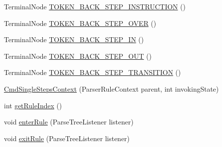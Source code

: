 \begin{DoxyCompactItemize}
\item 
Terminal\+Node \hyperlink{classgov_1_1nasa_1_1jpf_1_1inspector_1_1client_1_1parser_1_1_console_grammar_parser_1_1_cmd_single_steps_context_acb7be39b49bcbaf600f6c22a334f6948}{T\+O\+K\+E\+N\+\_\+\+B\+A\+C\+K\+\_\+\+S\+T\+E\+P\+\_\+\+I\+N\+S\+T\+R\+U\+C\+T\+I\+ON} ()
\item 
Terminal\+Node \hyperlink{classgov_1_1nasa_1_1jpf_1_1inspector_1_1client_1_1parser_1_1_console_grammar_parser_1_1_cmd_single_steps_context_aea2cfa751f70d23f30ddd33f78c74a2c}{T\+O\+K\+E\+N\+\_\+\+B\+A\+C\+K\+\_\+\+S\+T\+E\+P\+\_\+\+O\+V\+ER} ()
\item 
Terminal\+Node \hyperlink{classgov_1_1nasa_1_1jpf_1_1inspector_1_1client_1_1parser_1_1_console_grammar_parser_1_1_cmd_single_steps_context_a0e514f8306470231d1fcf880bfb5f018}{T\+O\+K\+E\+N\+\_\+\+B\+A\+C\+K\+\_\+\+S\+T\+E\+P\+\_\+\+IN} ()
\item 
Terminal\+Node \hyperlink{classgov_1_1nasa_1_1jpf_1_1inspector_1_1client_1_1parser_1_1_console_grammar_parser_1_1_cmd_single_steps_context_a7000949abc5a8c13d9a7c6f0e1751e67}{T\+O\+K\+E\+N\+\_\+\+B\+A\+C\+K\+\_\+\+S\+T\+E\+P\+\_\+\+O\+UT} ()
\item 
Terminal\+Node \hyperlink{classgov_1_1nasa_1_1jpf_1_1inspector_1_1client_1_1parser_1_1_console_grammar_parser_1_1_cmd_single_steps_context_a4d344e48a6694b9a86d3ec0191911046}{T\+O\+K\+E\+N\+\_\+\+B\+A\+C\+K\+\_\+\+S\+T\+E\+P\+\_\+\+T\+R\+A\+N\+S\+I\+T\+I\+ON} ()
\item 
\hyperlink{classgov_1_1nasa_1_1jpf_1_1inspector_1_1client_1_1parser_1_1_console_grammar_parser_1_1_cmd_single_steps_context_a1062f27b23c13a84f809b2d23f7e176c}{Cmd\+Single\+Steps\+Context} (Parser\+Rule\+Context parent, int invoking\+State)
\item 
int \hyperlink{classgov_1_1nasa_1_1jpf_1_1inspector_1_1client_1_1parser_1_1_console_grammar_parser_1_1_cmd_single_steps_context_a6dd88b9c8bf1ba8b7de1d9f49d92da9f}{get\+Rule\+Index} ()
\item 
void \hyperlink{classgov_1_1nasa_1_1jpf_1_1inspector_1_1client_1_1parser_1_1_console_grammar_parser_1_1_cmd_single_steps_context_ac1d1319f041ff6fd36b53474c88f7c36}{enter\+Rule} (Parse\+Tree\+Listener listener)
\item 
void \hyperlink{classgov_1_1nasa_1_1jpf_1_1inspector_1_1client_1_1parser_1_1_console_grammar_parser_1_1_cmd_single_steps_context_a90266b7317d7a97664192645dc233141}{exit\+Rule} (Parse\+Tree\+Listener listener)
\end{DoxyCompactItemize}
